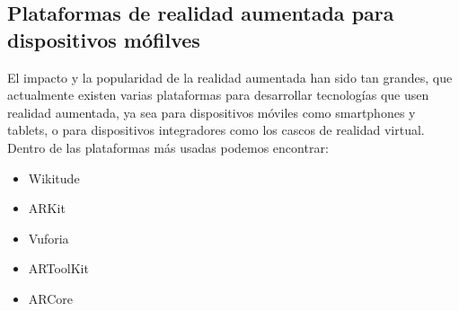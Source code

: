 \subsection{Plataformas de realidad aumentada para dispositivos mófilves}
El impacto y la popularidad de la realidad aumentada han sido tan grandes, que actualmente existen varias plataformas para desarrollar tecnologías que usen realidad aumentada, ya sea para dispositivos móviles como smartphones y tablets, o para dispositivos integradores como los cascos de realidad virtual. Dentro de las plataformas más usadas podemos encontrar:
\begin{itemize}
	\item Wikitude
	\item ARKit
	\item Vuforia
	\item ARToolKit
	\item ARCore
\end{itemize}
\newpage

